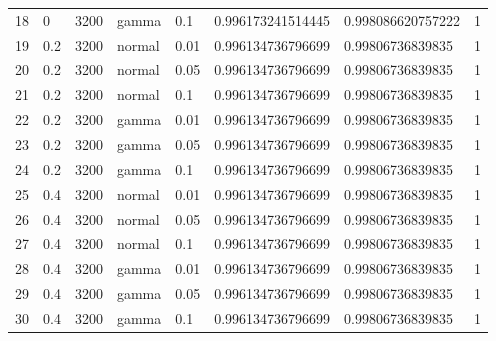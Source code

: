 \begin{table}[ht]
\begin{tabular}{rlllllll}
  18 & 0 & 3200 & gamma & 0.1 & 0.996173241514445 & 0.998086620757222 & 1 \\ 
  19 & 0.2 & 3200 & normal & 0.01 & 0.996134736796699 & 0.99806736839835 & 1 \\ 
  20 & 0.2 & 3200 & normal & 0.05 & 0.996134736796699 & 0.99806736839835 & 1 \\ 
  21 & 0.2 & 3200 & normal & 0.1 & 0.996134736796699 & 0.99806736839835 & 1 \\ 
  22 & 0.2 & 3200 & gamma & 0.01 & 0.996134736796699 & 0.99806736839835 & 1 \\ 
  23 & 0.2 & 3200 & gamma & 0.05 & 0.996134736796699 & 0.99806736839835 & 1 \\ 
  24 & 0.2 & 3200 & gamma & 0.1 & 0.996134736796699 & 0.99806736839835 & 1 \\ 
  25 & 0.4 & 3200 & normal & 0.01 & 0.996134736796699 & 0.99806736839835 & 1 \\ 
  26 & 0.4 & 3200 & normal & 0.05 & 0.996134736796699 & 0.99806736839835 & 1 \\ 
  27 & 0.4 & 3200 & normal & 0.1 & 0.996134736796699 & 0.99806736839835 & 1 \\ 
  28 & 0.4 & 3200 & gamma & 0.01 & 0.996134736796699 & 0.99806736839835 & 1 \\ 
  29 & 0.4 & 3200 & gamma & 0.05 & 0.996134736796699 & 0.99806736839835 & 1 \\ 
  30 & 0.4 & 3200 & gamma & 0.1 & 0.996134736796699 & 0.99806736839835 & 1 \\ 
   \hline
\end{tabular}
\end{table}

